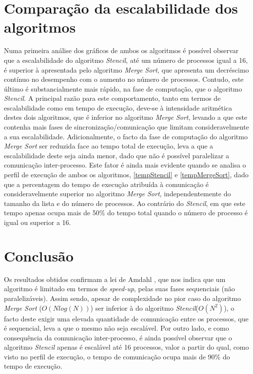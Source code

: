 \documentclass{article}
\begin{document}
\section{Comparação da escalabilidade dos algoritmos}
Numa primeira análise dos gráficos de ambos os algoritmos é possível observar que a escalabilidade 
do algoritmo \textit{Stencil}, até um número de processos igual a 16, é superior à apresentada pelo 
algoritmo \textit{Merge Sort}, que apresenta um decréscimo contínuo no desempenho com o aumento 
no número de processos. Contudo, este último é substancialmente mais rápido, na fase de computação, que o 
algoritmo \textit{Stencil}. A principal razão para este comportamento, tanto em termos de escalabilidade como 
em tempo de execução, deve-se à intensidade aritmética destes dois algoritmos, que é inferior no algoritmo 
\textit{Merge Sort}, levando a que este contenha mais fases de sincronização/comunicação que limitam 
consideravelmente a sua escalabilidade. Adicionalmente, o facto da fase de computação do algoritmo \textit{Merge Sort}
ser reduzida face ao tempo total de execução, leva a que a escalabilidade deste seja ainda menor, dado que não é possível
paralelizar a comunicação inter-processo.
Este fator é ainda mais evidente quando se analisa o perfil de execução de ambos os algoritmos, \ref{tempStencil} e 
\ref{tempMergeSort}, dado que a percentagem do tempo de execução atribuída à comunicação é consideravelmente superior
no algoritmo \textit{Merge Sort}, independentemente do tamanho da lista e do número de processos. Ao contrário do 
\textit{Stencil}, em que este tempo apenas ocupa mais de 50\% do tempo total quando o número de processo é igual ou 
superior a 16.

\section{Conclusão}
Os resultados obtidos confirmam a lei de Amdahl \cite{amdahl_multicore}, que nos indica que um algoritmo é 
limitado em termos de \textit{speed-up}, pelas suas fases sequenciais (não paralelizáveis). Assim sendo, 
apesar de complexidade no pior caso do algoritmo \textit{Merge Sort} ($O(Nlog(N))$) ser inferior à do 
algoritmo \textit{Stencil}($O(N^2)$), o facto deste exigir uma elevada quantidade de comunicação entre os processos, 
que é sequencial, leva a que o mesmo não seja escalável. Por outro lado, e como consequência da comunicação inter-processo,
é ainda possível observar que o algoritmo \textit{Stencil} apenas é escalável até 16 processos, valor a partir do qual,
como visto no perfil de execução, o tempo de comunicação ocupa mais de 90\% do tempo de execução.
\end{document}
